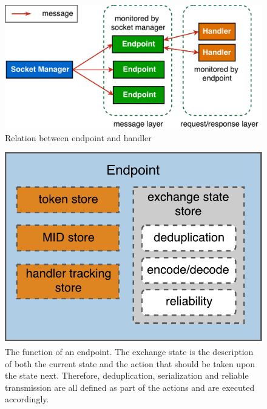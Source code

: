 \begin{figure}[!htbp]
\centering
\includegraphics[scale = 0.55]{coap_endpoint}
\caption{Relation between endpoint and handler}
\label{fig:coap_endpoint}
\end{figure}

\begin{figure}[!htbp]
\centering
\includegraphics[scale = 0.55]{coap_endpoint_inner}
\caption[The function of an endpoint]{The function of an endpoint. The exchange state is the description of both the current state and the action that should be taken upon the state next. Therefore, deduplication, serialization and reliable transmission are all defined as part of the actions and are executed accordingly.}
\label{fig:coap_endpoint_inner}
\end{figure}

